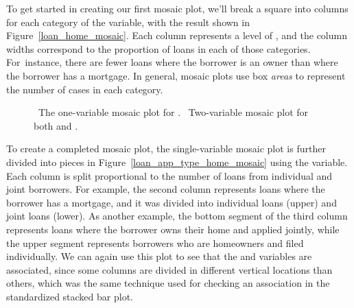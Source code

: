 To get started in creating our first mosaic plot,
we'll break a square into columns for each category
of the  variable,
with the result shown in Figure~\ref{loan_home_mosaic}.
Each column represents a level of ,
and the column widths correspond to the proportion of
loans in each of those categories.
For~instance, there are fewer loans where the borrower
is an owner than where the borrower has a mortgage.
In general, mosaic plots use box \emph{areas}
to represent the number of cases in each category.

\begin{figure}[h]
\centering
{}
\caption{~The one-variable mosaic
    plot for .
    ~Two-variable mosaic
    plot for both 
    and .}
\label{loan_app_type_home_mosaic_plot}
\end{figure}

To create a completed mosaic plot, the single-variable
mosaic plot is further divided into pieces in
Figure~\ref{loan_app_type_home_mosaic} using the
 variable.
Each column is split proportional to the
number of loans from individual and joint
borrowers.
For example, the second column represents loans
where the borrower has a mortgage,
and it was divided into individual loans (upper)
and joint loans (lower).
As another example, the bottom segment of the third column
represents loans where the borrower owns their home
and applied jointly, while the upper segment represents
borrowers who are homeowners and filed individually.
We can again use this plot to see that
the  and 
variables are associated, since some columns are divided
in different vertical locations than others,
which was the same technique used for checking an
association in the standardized stacked bar plot.


